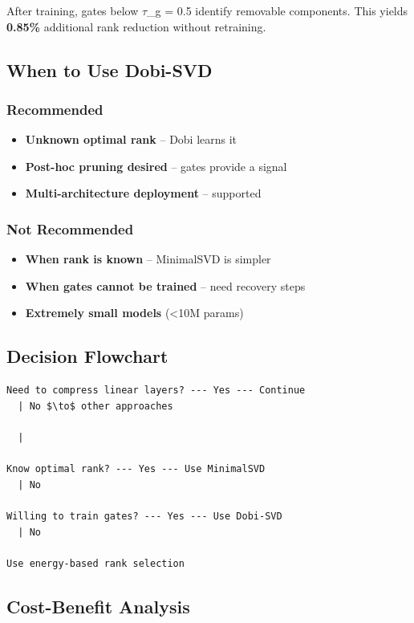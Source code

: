 After training, gates below $\tau$\_g = 0.5 identify removable components. This 
yields \textbf{0.85\%} additional rank reduction without retraining.

\subsection{When to Use Dobi-SVD}

\subsubsection{Recommended}

\begin{itemize}
\item \textbf{Unknown optimal rank} -- Dobi learns it
\item \textbf{Post-hoc pruning desired} -- gates provide a signal
\item \textbf{Multi-architecture deployment} -- supported

\end{itemize}
\subsubsection{Not Recommended}

\begin{itemize}
\item \textbf{When rank is known} -- MinimalSVD is simpler
\item \textbf{When gates cannot be trained} -- need recovery steps
\item \textbf{Extremely small models} (\textless{}10M params)

\end{itemize}
\subsection{Decision Flowchart}

\begin{lstlisting}
Need to compress linear layers? --- Yes --- Continue
  | No $\to$ other approaches

  |
   
Know optimal rank? --- Yes --- Use MinimalSVD
  | No
   
Willing to train gates? --- Yes --- Use Dobi-SVD
  | No
   
Use energy-based rank selection
\end{lstlisting}

\subsection{Cost-Benefit Analysis}

